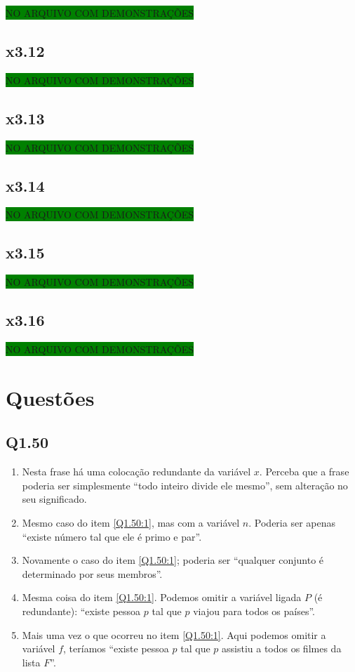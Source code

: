 \documentclass[portuguese,a4paper,12pt]{article}
\begin{document}
	\colorbox{green}{NO ARQUIVO COM DEMONSTRAÇÕES}
	
	\subsection*{x3.12}
	
	\colorbox{green}{NO ARQUIVO COM DEMONSTRAÇÕES}
	
	\subsection*{x3.13}
	
	\colorbox{green}{NO ARQUIVO COM DEMONSTRAÇÕES}
	
	\subsection*{x3.14}
	
	\colorbox{green}{NO ARQUIVO COM DEMONSTRAÇÕES}
	
	\subsection*{x3.15}
	
	\colorbox{green}{NO ARQUIVO COM DEMONSTRAÇÕES}
	
	\subsection*{x3.16}
	
	\colorbox{green}{NO ARQUIVO COM DEMONSTRAÇÕES}
	
	\section*{\centering Questões}
	
	\subsection*{Q1.50}
	
	\begin{enumerate}[label=(\arabic*)]
		\item \label{Q1.50:1} Nesta frase há uma colocação redundante da variável $x$. Perceba que a frase poderia ser simplesmente ``todo inteiro divide ele mesmo'', sem alteração no seu significado.
		\item Mesmo caso do item \ref{Q1.50:1}, mas com a variável $n$. Poderia ser apenas ``existe número tal que ele é primo e par''.
		\item Novamente o caso do item \ref{Q1.50:1}; poderia ser ``qualquer conjunto é determinado por seus membros''.
		\item Mesma coisa do item \ref{Q1.50:1}. Podemos omitir a variável ligada $P$ (é redundante): ``existe pessoa $p$ tal que $p$ viajou para todos os países''.
		\item Mais uma vez o que ocorreu no item \ref{Q1.50:1}. Aqui podemos omitir a variável $f$, teríamos ``existe pessoa $p$ tal que $p$ assistiu a todos os filmes da lista $F$''.
	\end{enumerate}
	
\end{document}
